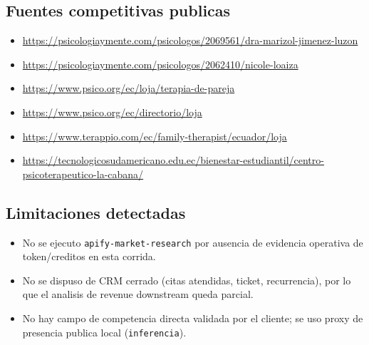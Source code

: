 \documentclass[9pt,a4paper,twocolumn,twoside]{tau-class/tau}
\begin{document}
\subsection{Fuentes competitivas publicas}
\begin{itemize}
  \item \url{https://psicologiaymente.com/psicologos/2069561/dra-marizol-jimenez-luzon}
  \item \url{https://psicologiaymente.com/psicologos/2062410/nicole-loaiza}
  \item \url{https://www.psico.org/ec/loja/terapia-de-pareja}
  \item \url{https://www.psico.org/ec/directorio/loja}
  \item \url{https://www.terappio.com/ec/family-therapist/ecuador/loja}
  \item \url{https://tecnologicosudamericano.edu.ec/bienestar-estudiantil/centro-psicoterapeutico-la-cabana/}
\end{itemize}

\subsection{Limitaciones detectadas}
\begin{itemize}
  \item No se ejecuto \texttt{apify-market-research} por ausencia de evidencia operativa de token/creditos en esta corrida.
  \item No se dispuso de CRM cerrado (citas atendidas, ticket, recurrencia), por lo que el analisis de revenue downstream queda parcial.
  \item No hay campo de competencia directa validada por el cliente; se uso proxy de presencia publica local (\texttt{inferencia}).
\end{itemize}
\end{document}
